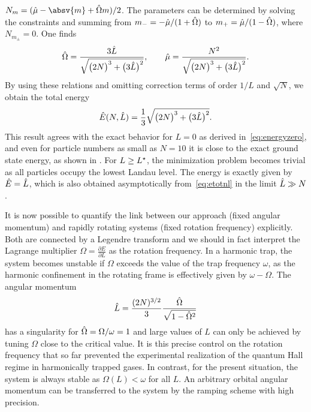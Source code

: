 $N_m=(\dl{\mu}-\absv{m}+\dl{\Omega} m)/2$.
The parameters can be determined by solving the constraints and summing from $m_-=-{\hat \mu}/(1+{\hat \Omega})$ to $m_+={\hat \mu}/(1-{\hat \Omega})$, where $N_{m_\pm}=0$. One finds
\begin{align*}
{\hat \Omega} = \frac{3 {\hat L}}{\sqrt{\big(2N\big)^3 + \big(3{\hat L}\big)^2}}, \qquad {\hat \mu}= \frac{N^2}{\sqrt{\big(2N\big)^3 + \big(3{\hat L}\big)^2}}.
\end{align*}
By using these relations and omitting correction terms of order $1/L$ and $\sqrt{N}$, we obtain the total energy
\begin{align} \label{eq:etotnl}
{\hat E}(N,{\hat L})= \frac{1}{3} \sqrt{\big(2N\big)^3 + \big(3{\hat L}\big)^2}.
\end{align}
This result agrees with the exact behavior for $L=0$ as derived in~\eqref{eq:energyzero}, and even for particle numbers as small as $N=10$ it is close to the exact ground state energy, as shown in . For $L\ge L^{\star}$, the minimization problem becomes trivial as all particles occupy the lowest Landau level. The energy is exactly given by ${\hat E}={\hat L}$, which is also obtained asymptotically from~\eqref{eq:etotnl} in the limit ${\hat L}\gg N$.

It is now possible to quantify the link between our approach (fixed angular momentum) and rapidly rotating systems (fixed rotation frequency) explicitly. Both are connected by a Legendre transform and we should in fact interpret the Lagrange multiplier $\Omega=\frac{\partial E}{\partial L}$
as the rotation frequency. In a harmonic trap, the system becomes unstable if $\Omega$ exceeds the value of the trap frequency $\omega$, as the harmonic confinement in the rotating frame is effectively given by $\omega-\Omega$. The angular momentum
\begin{align*}
{\hat L}=\frac{(2N)^{3/2}}{3} \frac{{\hat \Omega}}{\sqrt{1-{\hat \Omega}^2}}
\end{align*}
has a singularity for ${\hat \Omega}=\Omega/\omega=1$ and large values of $L$ can only be achieved by tuning $\Omega$ close to the critical value. It is this precise control on the rotation frequency that so far prevented the experimental realization of the quantum Hall regime in harmonically trapped gases. In contrast, for the present situation, the system is always stable as $\Omega(L)<\omega$ for all $L$. An arbitrary orbital angular momentum can be transferred to the system by the ramping scheme with high precision.


